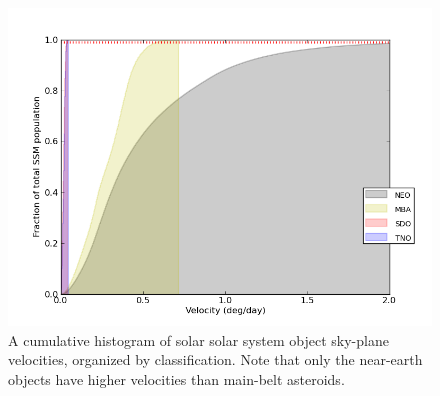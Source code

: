 \documentclass[12pt,preprint]{aastex}
\begin{document}
\label{velAccLimits}
\begin{figure}[ht!]
  \centering
  \includegraphics[width=13cm]{illustrations/mopsplots/aug2011/n_velocity.png}
  \caption{A cumulative histogram of solar solar system object
    sky-plane velocities, organized by classification.  Note that only
    the near-earth objects have higher velocities than main-belt
    asteroids.}
  \label{velSurvey}
\end{figure}
\end{document}
